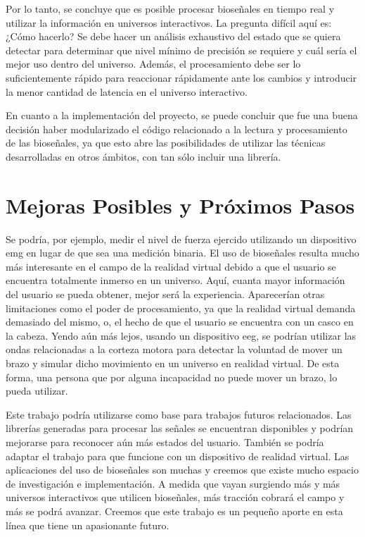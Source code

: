 Por lo tanto, se concluye que es posible procesar bioseñales en tiempo real y utilizar la información en universos interactivos. La pregunta difícil aquí es: ¿Cómo hacerlo? Se debe hacer un análisis exhaustivo del estado que se quiera detectar para determinar que nivel mínimo de precisión se requiere y cuál sería el mejor uso dentro del universo. Además, el procesamiento debe ser lo suficientemente rápido para reaccionar rápidamente ante los cambios y introducir la menor cantidad de latencia en el universo interactivo.

En cuanto a la implementación del proyecto, se puede concluir que fue una buena decisión haber modularizado el código relacionado a la lectura y procesamiento de las bioseñales, ya que esto abre las posibilidades de utilizar las técnicas desarrolladas en otros ámbitos, con tan sólo incluir una librería.

\section{Mejoras Posibles y Próximos Pasos}

Se podría, por ejemplo, medir el nivel de fuerza ejercido utilizando un dispositivo \acrshort{emg} en lugar de que sea una medición binaria. El uso de bioseñales resulta mucho más interesante en el campo de la realidad virtual debido a que el usuario se encuentra totalmente inmerso en un universo. Aquí, cuanta mayor información del usuario se pueda obtener, mejor será la experiencia. Aparecerían otras limitaciones como el poder de procesamiento, ya que la realidad virtual demanda demasiado del mismo, o, el hecho de que el usuario se encuentra con un casco en la cabeza. Yendo aún más lejos, usando un dispositivo \acrshort{eeg}, se podrían utilizar las ondas relacionadas a la corteza motora para detectar la voluntad de mover un brazo y simular dicho movimiento en un universo en realidad virtual. De esta forma, una persona que por alguna incapacidad no puede mover un brazo, lo pueda utilizar.

Este trabajo podría utilizarse como base para trabajos futuros relacionados. Las librerías generadas para procesar las señales se encuentran disponibles y podrían mejorarse para reconocer aún más estados del usuario. También se podría adaptar el trabajo para que funcione con un dispositivo de realidad virtual. Las aplicaciones del uso de bioseñales son muchas y creemos que existe mucho espacio de investigación e implementación. A medida que vayan surgiendo más y más universos interactivos que utilicen bioseñales, más tracción cobrará el campo y más se podrá avanzar. Creemos que este trabajo es un pequeño aporte en esta línea que tiene un apasionante futuro.